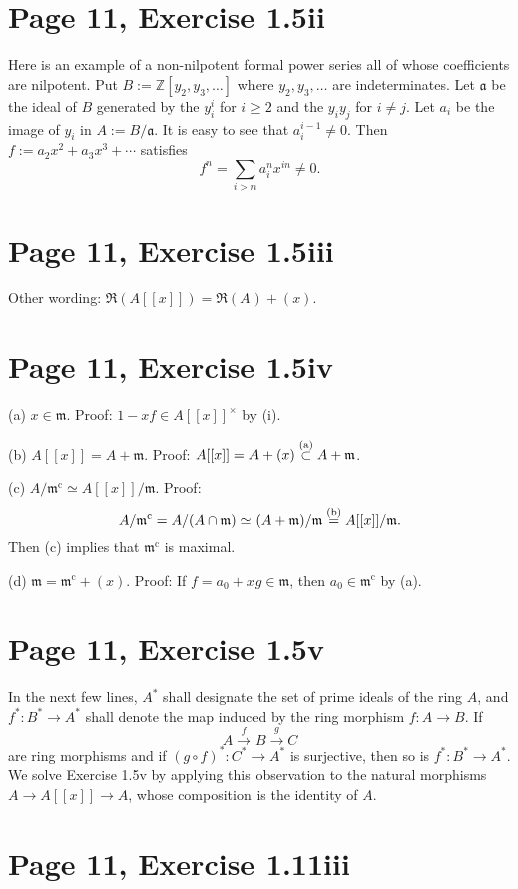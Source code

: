 \documentclass[parskip=half]{scrartcl}%
\newcommand{\oo}{\operatorname}
\newcommand{\mf}{\mathfrak}
\newcommand{\aaa}{\mf a}
\begin{document}
\section{Page 11, Exercise 1.5ii}

Here is an example of a non-nilpotent formal power series all of whose coefficients are nilpotent. Put $B:=\mathbb Z[y_2,y_3,\dots]$ where $y_2,y_3,\dots$ are indeterminates. Let $\aaa$ be the ideal of $B$ generated by the $y_i^i$ for $i\ge2$ and the $y_iy_j$ for $i\neq j$. Let $a_i$ be the image of $y_i$ in $A:=B/\aaa$. It is easy to see that $a_i^{i-1}\neq0$. Then $f:=a_2x^2+a_3x^3+\cdots$ satisfies 
$$
f^n=\sum_{i>n}a_i^nx^{in}\neq0.
$$

\section{Page 11, Exercise 1.5iii}

Other wording: $\mf R(A[[x]])=\mf R(A)+(x)$.

\section{Page 11, Exercise 1.5iv}

(a) $x\in\mf m$. Proof: $1-xf\in A[[x]]^\times$ by (i).

(b) $A[[x]]=A+\mf m$. Proof: $A[[x]]=A+(x)\overset{(\text a)}\subset A+\mf m$.

(c) $A/\mf m^{\oo c}\simeq A[[x]]/\mf m$. Proof: 
$$
A/\mf m^{\oo c}=A/(A\cap\mf m)\simeq(A+\mf m)/\mf m\overset{(\text b)}=A[[x]]/\mf m.
$$ 
Then (c) implies that $\mf m^{\oo c}$ is maximal.

(d) $\mf m=\mf m^{\oo c}+(x)$. Proof: If $f=a_0+xg\in\mf m$, then $a_0\in\mf m^{\oo c}$ by (a).

\section{Page 11, Exercise 1.5v}

In the next few lines, $A^*$ shall designate the set of prime ideals of the ring $A$, and $f^*:B^*\to A^*$ shall denote the map induced by the ring morphism $f:A\to B$. If 
$$
A\xrightarrow fB\xrightarrow gC
$$ 
are ring morphisms and if $(g\circ f)^*:C^*\to A^*$ is surjective, then so is $f^*:B^*\to A^*$. We solve Exercise 1.5v by applying this observation to the natural morphisms $A\to A[[x]]\to A$, whose composition is the identity of $A$.

\section{Page 11, Exercise 1.11iii}%
\end{document}
